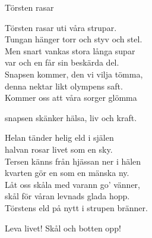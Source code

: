 \begin{song}{Törsten rasar}
	
	
	
	Törsten rasar uti våra strupar.\\
	Tungan hänger torr och styv och stel.\\
	Men snart vankas stora långa supar\\
	var och en får sin beskärda del.\\
	Snapsen kommer, den vi vilja tömma,\\
	denna nektar likt olympens saft.\\
	Kommer oss att våra sorger glömma\\
	\begin{repetition}
		snapsen skänker hälsa, liv och kraft.
	\end{repetition}
	
	Helan tänder helig eld i själen\\
	halvan rosar livet som en sky.\\
	Tersen känns från hjässan ner i hälen\\
	kvarten gör en som en mänska ny.\\
	Låt oss skåla med varann go' vänner,\\
	skål för våran levnads glada hopp.\\
	Törstens eld på nytt i strupen bränner.\\
	\begin{repetition}
		Leva livet! Skål och botten opp!
	\end{repetition}
	
\end{song}
